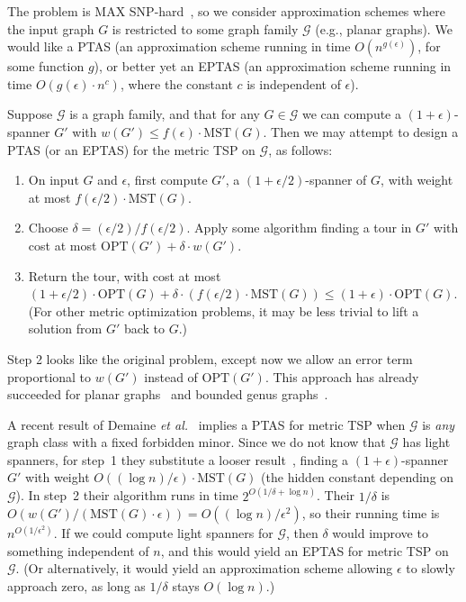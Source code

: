 \documentclass{llncs}
\def\MST{\mbox{MST}}\def\OPT{\mbox{OPT}}\def\Left{\mbox{left}}\def\In#1{\mbox{in$(#1)$}} \def\Out#1{\mbox{out$(#1)$}} \def\Net#1{\mbox{net$(#1)$}} \def\xeP{x_{(e,P)}}
\begin{document}
The problem is MAX SNP-hard~\cite{PY-tsp12-93}, so we consider
approximation schemes where the input graph $G$ is restricted to some
graph family $\mathcal{G}$ (e.g., planar graphs).  We would like a
PTAS (an approximation scheme running in time $O(n^{g(\epsilon)})$,
for some function $g$), or better yet an EPTAS (an approximation
scheme running in time $O(g(\epsilon)\cdot n^c)$, where the constant
$c$ is independent of $\epsilon$).

Suppose $\mathcal{G}$ is a graph family, and that for any $G \in
\mathcal{G}$ we can compute a $(1+\epsilon)$-spanner $G'$ with $w(G')
\leq f(\epsilon)\cdot \MST(G)$.  Then we may attempt to design a PTAS
(or an EPTAS) for the metric TSP on $\mathcal{G}$, as follows:
\begin{enumerate}

\item On input $G$ and $\epsilon$, first compute $G'$, a
  $(1+\epsilon/2)$-spanner of $G$, with weight at most
  $f(\epsilon/2)\cdot \MST(G)$.

\item Choose $\delta = (\epsilon/2)/f(\epsilon/2)$.
Apply some algorithm finding a tour in $G'$ with cost at most
$\OPT(G') + \delta \cdot w(G')$.

\item Return the tour, with cost at most $(1 + \epsilon/2)\cdot\OPT(G)
+ \delta \cdot (f(\epsilon/2)\cdot\MST(G)) \leq
(1+\epsilon)\cdot\OPT(G)$.  (For other metric optimization problems,
it may be less trivial to lift a solution from $G'$ back to $G$.)

\end{enumerate}
Step 2 looks like the original problem, except now we allow an error term
proportional to $w(G')$ instead of $\OPT(G')$.   This
approach has already succeeded for planar graphs~\cite
{DBLP:conf/soda/AroraGKKW98,KleinTSP2005} and bounded genus
graphs~\cite
{Demaine:2007:AAV:1283383.1283413,Grigni:2000:ATG:646253.686316}.

A recent result of Demaine \textit{et
al.}~\cite[Thm.~2]{ContractionMinorFree_STOC2011} implies a PTAS for
metric TSP when $\mathcal{G}$ is \emph{any} graph class with a fixed
forbidden minor.  Since we do not know that $\mathcal{G}$ has light
spanners, for step~1 they substitute a looser result~\cite
{Grigni:2002:LSA:545381.545492}, finding a $(1+\epsilon)$-spanner $G'$
with weight $O((\log n )/\epsilon)\cdot\MST(G)$ (the hidden constant
depending on $\mathcal{G}$).  In step~2 their algorithm runs in time
$2^{O(1/\delta + \log n)}$. Their $1/\delta$ is
$O(w(G')/(\MST(G)\cdot\epsilon))=O((\log n)/\epsilon^2)$, so their
running time is $n^{O(1/\epsilon^2)}$.  If we could compute light
spanners for $\mathcal{G}$, then $\delta$ would improve to something
independent of $n$, and this would yield an EPTAS for metric TSP on
$\mathcal{G}$. (Or alternatively, it would yield an approximation
scheme allowing $\epsilon$ to slowly approach zero, as long as
$1/\delta$ stays $O(\log n)$.)
\end{document}
